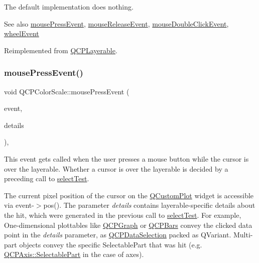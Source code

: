 The default implementation does nothing.

\begin{DoxySeeAlso}{See also}
\mbox{\hyperlink{class_q_c_p_color_scale_a91f633b97ffcd57fdf8cd814974c20e6}{mouse\+Press\+Event}}, \mbox{\hyperlink{class_q_c_p_color_scale_a6a35dd39ab4e5cb2d7b29ebb4d5b61b0}{mouse\+Release\+Event}}, \mbox{\hyperlink{class_q_c_p_layerable_a4171e2e823aca242dd0279f00ed2de81}{mouse\+Double\+Click\+Event}}, \mbox{\hyperlink{class_q_c_p_color_scale_a63cf19be184f6670c9495ad3a9a1baeb}{wheel\+Event}} 
\end{DoxySeeAlso}


Reimplemented from \mbox{\hyperlink{class_q_c_p_layerable_a9eee1ba47fd69be111059ca3881933e4}{Q\+C\+P\+Layerable}}.

\mbox{\label{class_q_c_p_color_scale_a91f633b97ffcd57fdf8cd814974c20e6}} 
\subsubsection{\texorpdfstring{mousePressEvent()}{mousePressEvent()}}
{\footnotesize\ttfamily void Q\+C\+P\+Color\+Scale\+::mouse\+Press\+Event (\begin{DoxyParamCaption}\item[{Q\+Mouse\+Event $\ast$}]{event,  }\item[{const Q\+Variant \&}]{details }\end{DoxyParamCaption})\hspace{0.3cm}{\ttfamily [protected]}, {\ttfamily [virtual]}}

This event gets called when the user presses a mouse button while the cursor is over the layerable. Whether a cursor is over the layerable is decided by a preceding call to \mbox{\hyperlink{class_q_c_p_layout_element_ae97f483cccedadbf18ea4525ef240ee4}{select\+Test}}.

The current pixel position of the cursor on the \mbox{\hyperlink{class_q_custom_plot}{Q\+Custom\+Plot}} widget is accessible via {\ttfamily event-\/$>$pos()}. The parameter {\itshape details} contains layerable-\/specific details about the hit, which were generated in the previous call to \mbox{\hyperlink{class_q_c_p_layout_element_ae97f483cccedadbf18ea4525ef240ee4}{select\+Test}}. For example, One-\/dimensional plottables like \mbox{\hyperlink{class_q_c_p_graph}{Q\+C\+P\+Graph}} or \mbox{\hyperlink{class_q_c_p_bars}{Q\+C\+P\+Bars}} convey the clicked data point in the {\itshape details} parameter, as \mbox{\hyperlink{class_q_c_p_data_selection}{Q\+C\+P\+Data\+Selection}} packed as Q\+Variant. Multi-\/part objects convey the specific {\ttfamily Selectable\+Part} that was hit (e.\+g. \mbox{\hyperlink{class_q_c_p_axis_abee4c7a54c468b1385dfce2c898b115f}{Q\+C\+P\+Axis\+::\+Selectable\+Part}} in the case of axes).

